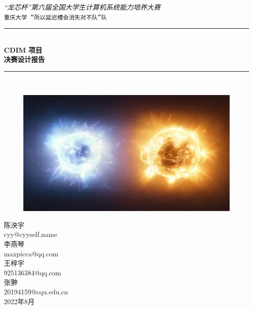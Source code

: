 \documentclass[black,normal,cn,hide]{elegantbook}
\newcommand{\artdate}{2022年8月}
\newcommand{\hlrule}{\rule{\linewidth}{0.5mm}}
\begin{document}

\begin{titlepage}
    \vfill
    \center 
    \textit{\Large “龙芯杯”第六届全国大学生计算机系统能力培养大赛}\\[0.5cm] 
    \texttt{\Large 重庆大学 “所以延迟槽会消失对不队”队}
  
    \vspace{1.5 cm}
    \hlrule \\[0.4 cm]
    { \huge \bfseries CDIM 项目}\\[0.4cm]
    { \huge \bfseries 决赛设计报告}\\
    \hlrule \\[1cm]
   
    \begin{figure}[h]
      \centering
      \includegraphics[width=0.5\linewidth]{img/logo.png}
    \end{figure}
   
   \vspace{0.5 cm}
  
    \vspace{.5 cm}
    陈泱宇\\
    cyy@cyyself.name\\
    \vspace{.5 cm}
    李燕琴\\
    maxpicca@qq.com\\
    \vspace{.5 cm}
    王梓宇\\
    925136384@qq.com\\
    \vspace{.5 cm}
    张翀\\
    20194159@cqu.edu.cn\\
  
    \vspace{2 cm}
    {\large \artdate}\\[3cm] 
  
  \vfill
  
\end{titlepage}
\end{document}
